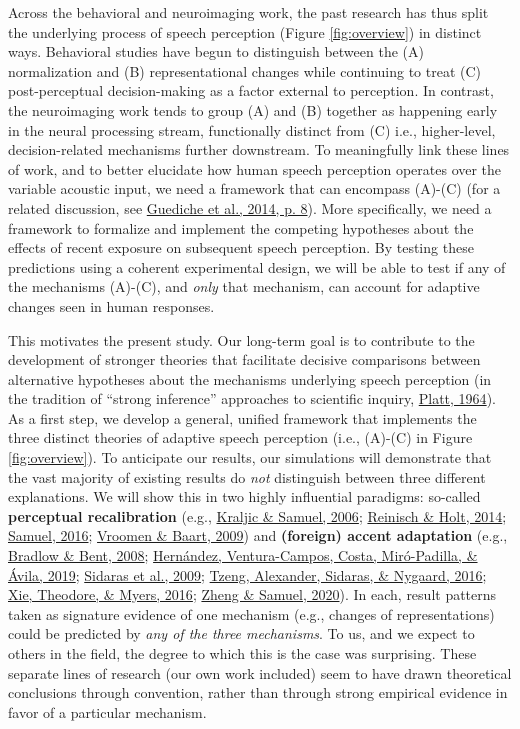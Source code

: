 \documentclass[
  11pt,
  english,
  man,floatsintext]{apa6}
\begin{document}
Across the behavioral and neuroimaging work, the past research has thus split the underlying process of speech perception (Figure \ref{fig:overview}) in distinct ways. Behavioral studies have begun to distinguish between the (A) normalization and (B) representational changes while continuing to treat (C) post-perceptual decision-making as a factor external to perception. In contrast, the neuroimaging work tends to group (A) and (B) together as happening early in the neural processing stream, functionally distinct from (C) i.e., higher-level, decision-related mechanisms further downstream. To meaningfully link these lines of work, and to better elucidate how human speech perception operates over the variable acoustic input, we need a framework that can encompass (A)-(C) (for a related discussion, see \protect\hyperlink{ref-guediche2014}{Guediche et al., 2014, p. 8}). More specifically, we need a framework to formalize and implement the competing hypotheses about the effects of recent exposure on subsequent speech perception. By testing these predictions using a coherent experimental design, we will be able to test if any of the mechanisms (A)-(C), and \emph{only} that mechanism, can account for adaptive changes seen in human responses.

This motivates the present study. Our long-term goal is to contribute to the development of stronger theories that facilitate decisive comparisons between alternative hypotheses about the mechanisms underlying speech perception (in the tradition of {``strong inference''} approaches to scientific inquiry, \protect\hyperlink{ref-platt1964}{Platt, 1964}). As a first step, we develop a general, unified framework that implements the three distinct theories of adaptive speech perception (i.e., (A)-(C) in Figure \ref{fig:overview}). To anticipate our results, our simulations will demonstrate that the vast majority of existing results do \emph{not} distinguish between three different explanations. We will show this in two highly influential paradigms: so-called \textbf{perceptual recalibration} (e.g., \protect\hyperlink{ref-kraljic-samuel2006}{Kraljic \& Samuel, 2006}; \protect\hyperlink{ref-reinisch-holt2014}{Reinisch \& Holt, 2014}; \protect\hyperlink{ref-samuel2016}{Samuel, 2016}; \protect\hyperlink{ref-vroomen-baart2009}{Vroomen \& Baart, 2009}) and \textbf{(foreign) accent adaptation} (e.g., \protect\hyperlink{ref-bradlow-bent2008}{Bradlow \& Bent, 2008}; \protect\hyperlink{ref-hernandez2019}{Hernández, Ventura-Campos, Costa, Miró-Padilla, \& Ávila, 2019}; \protect\hyperlink{ref-sidaras2009}{Sidaras et al., 2009}; \protect\hyperlink{ref-tzeng2016}{Tzeng, Alexander, Sidaras, \& Nygaard, 2016}; \protect\hyperlink{ref-xie2016jep}{Xie, Theodore, \& Myers, 2016}; \protect\hyperlink{ref-zheng-samuel2020}{Zheng \& Samuel, 2020}). In each, result patterns taken as signature evidence of one mechanism (e.g., changes of representations) could be predicted by \emph{any of the three mechanisms}. To us, and we expect to others in the field, the degree to which this is the case was surprising. These separate lines of research (our own work included) seem to have drawn theoretical conclusions through convention, rather than through strong empirical evidence in favor of a particular mechanism.
\end{document}
